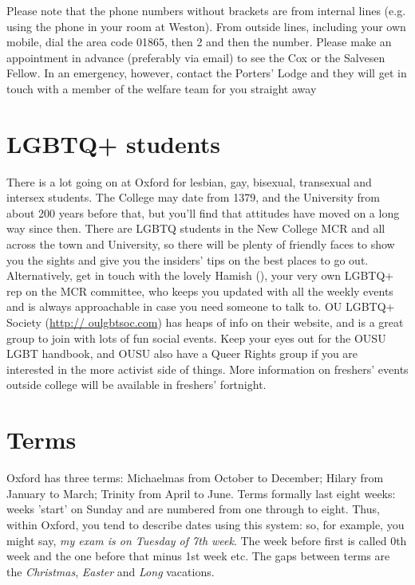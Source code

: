 Please note that the phone numbers without brackets are from internal lines (e.g. using the phone in your room at Weston). From outside lines, including your own mobile, dial the area code 01865, then 2 and then the number. Please make an appointment in advance (preferably via email) to see the Cox or the Salvesen Fellow. In an emergency, however, contact the Porters' Lodge and they will get in touch with a member of the welfare team for you straight away

\section{LGBTQ+ students}
There is a lot going on at Oxford for lesbian, gay, bisexual, transexual and
intersex students. The College may date from 1379, and the University from about
200 years before that, but you'll find that attitudes have moved on a long way
since then. There are LGBTQ students in the New College MCR and all across the
town and University, so there will be plenty of friendly faces to show you the
sights and give you the insiders' tips on the best places to go out.
Alternatively, get in touch with the lovely Hamish
(\href{mailto:martin.hallmannsecker@new.ox.ac.uk}{}), your very own LGBTQ+ rep on the MCR committee, who keeps you updated with all the weekly events and is always approachable in case you need someone to talk to. OU LGBTQ+ Society (\url{http:// oulgbtsoc.com}) has heaps of info on their website, and is a great group to join with lots of fun social events. Keep your eyes out for the OUSU LGBT handbook, and OUSU also have a Queer Rights group if you are interested in the more activist side of things. More information on freshers' events outside college will be available in freshers' fortnight.

\section{Terms}
Oxford has three terms: Michaelmas from October to December; Hilary from January
to March; Trinity from April to June. Terms formally last eight weeks: weeks
'start' on Sunday and are numbered from one through to eight. Thus, within
Oxford, you tend to describe dates using this system: so, for example, you might
say, \emph{my exam is on Tuesday of 7th week}. The week before first is called
0th week and the one before that minus 1st week etc. The gaps between terms are the \emph{Christmas}, \emph{Easter} and \emph{Long} vacations.
\medskip


